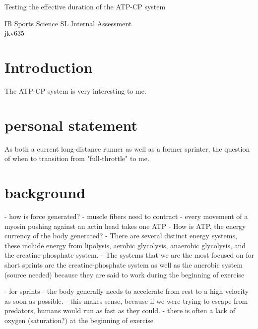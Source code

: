 \documentclass[index]{subfiles}
\begin{document}
\begin{titlepage}
    \begin{center}
        \vspace*{1cm}

        {\huge{Testing the effective duration of the ATP-CP system}}

        \vspace{1.5cm}

        \vfill

        IB Sports Science SL Internal Assessment\\
        jkv635\\

    \end{center}
\end{titlepage}

\tableofcontents
\thispagestyle{empty}
\newpage
\setcounter{page}{1}

\section{Introduction}

The ATP-CP system is very interesting to me.

\newpage

\section{personal statement}
As both a current long-distance runner as well as a former sprinter, the question of when to transition from "full-throttle" to me.

\section{background}
- how is force generated?
- muscle fibers need to contract
- every movement of a myosin pushing against an actin head takes one ATP
- How is ATP, the energy currency of the body generated?
- There are several distinct energy systems, these include energy from lipolysis, aerobic glycolysis, anaerobic glycolysis, and the creatine-phosphate system.
- The systems that we are the most focused on for short sprints are the creatine-phosphate system as well as the anerobic system (source needed) because they are said to work during the beginning of exercise

- for sprints
- the body generally needs to accelerate from rest to a high velocity as soon as possible.
- this makes sense, because if we were trying to escape from predators, humans would run as fast as they could.
- there is often a lack of oxygen (saturation?) at the beginning of exercise
\end{document}
